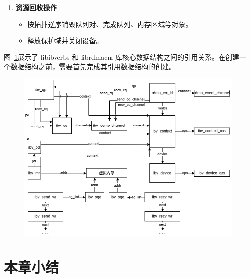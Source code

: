 {\begin{enumerate}[label=\textbf{步骤 \arabic*.}, leftmargin=0.5cm, align=left]
    \item \textbf{资源回收操作}
    \begin{itemize}
        \item 按拓扑逆序销毁队列对、完成队列、内存区域等对象。
        \item 释放保护域并关闭设备。
    \end{itemize}
\end{enumerate}
图~\ref{fig:RDMA-structs}展示了 libibverbs 和 librdmacm 库核心数据结构之间的引用关系。在创建一个数据结构之前，需要首先完成其引用数据结构的创建。
\begin{figure}[!htbp]
    \centering
    \includegraphics[width=\linewidth]{Img/RDMA-structs.png}
    \label{fig:RDMA-structs}
\end{figure}



\section{本章小结}
}